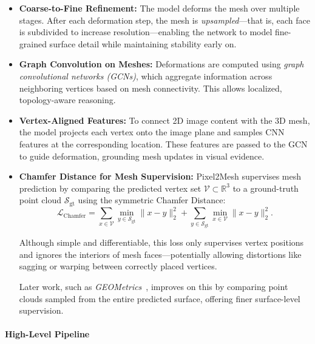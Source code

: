 \begin{itemize}
    \item \textbf{Coarse-to-Fine Refinement:} The model deforms the mesh over multiple stages. After each deformation step, the mesh is \emph{upsampled}—that is, each face is subdivided to increase resolution—enabling the network to model fine-grained surface detail while maintaining stability early on.
    
    \item \textbf{Graph Convolution on Meshes:} Deformations are computed using \emph{graph convolutional networks (GCNs)}, which aggregate information across neighboring vertices based on mesh connectivity. This allows localized, topology-aware reasoning.
    
    \item \textbf{Vertex-Aligned Features:} To connect 2D image content with the 3D mesh, the model projects each vertex onto the image plane and samples CNN features at the corresponding location. These features are passed to the GCN to guide deformation, grounding mesh updates in visual evidence.
    
    \item \textbf{Chamfer Distance for Mesh Supervision:} 
    Pixel2Mesh supervises mesh prediction by comparing the predicted vertex set \( \mathcal{V} \subset \mathbb{R}^3 \) to a ground-truth point cloud \( \mathcal{S}_{\text{gt}} \) using the symmetric Chamfer Distance:
    \[
    \mathcal{L}_{\text{Chamfer}} = \sum_{x \in \mathcal{V}} \min_{y \in \mathcal{S}_{\text{gt}}} \|x - y\|_2^2 + \sum_{y \in \mathcal{S}_{\text{gt}}} \min_{x \in \mathcal{V}} \|x - y\|_2^2.
    \]
    
    \newpage
    
    Although simple and differentiable, this loss only supervises vertex positions and ignores the interiors of mesh faces—potentially allowing distortions like sagging or warping between correctly placed vertices. 
    
    Later work, such as \emph{GEOMetrics}~\cite{smith2019_geometric}, improves on this by comparing point clouds sampled from the entire predicted surface, offering finer surface-level supervision.
    
\end{itemize}

\paragraph{High-Level Pipeline}

